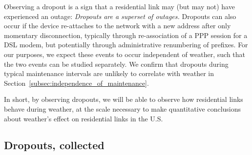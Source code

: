 
Observing a dropout is a sign that a residential link may (but may not) have
experienced an outage:
%
\emph{Dropouts are a superset of outages.}
%
Dropouts can also occur if the device re-attaches to the
network with a new address after only momentary
disconnection, typically through re-association of a PPP
session for a DSL modem, but potentially through
administrative renumbering of prefixes. For our purposes, we
expect these events to occur independent of weather, such
that the two events can be studied separately.
%
%
%
%
We confirm that dropouts during typical maintenance intervals are
unlikely to correlate with weather in
Section~\ref{subsec:independence_of_maintenance}.

%

In short, by observing dropouts, we will be able to observe how residential
links behave during weather, at the scale necessary to make quantitative
conclusions about weather's effect on residential links in the U.S.
%


\subsection{Dropouts, collected}

